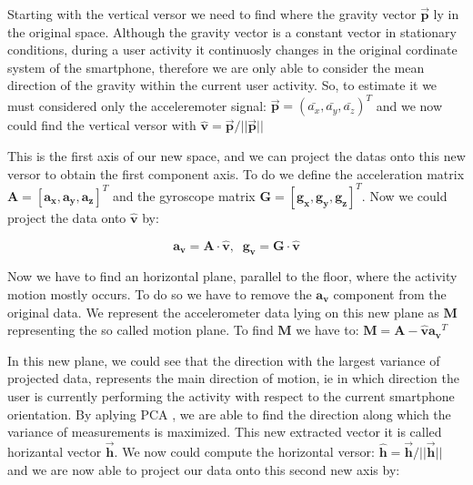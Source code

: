 Starting with the vertical versor we need to find where the gravity vector $\boldsymbol{\vec{p}}$ ly in the original space. Although the gravity vector is a constant vector in stationary conditions, during a user activity it continuosly changes in the original cordinate system of the smartphone, therefore we are only able to consider the mean direction of the gravity within the current user activity. So, to estimate it we must considered only the acceleremoter signal: $ \boldsymbol{\vec{p}} = (\bar{a_{x}}, \bar{a_{y}}, \bar{a_{z}})^{T}$  and we now could find the vertical versor with $ \boldsymbol{\hat{v}} = \boldsymbol{\vec{p}} / ||\boldsymbol{\vec{p}}|| $

This is the first axis of our new space, and we can project the datas onto this new versor to obtain the first component axis. To do we define the acceleration matrix $\boldsymbol{A} = [ \boldsymbol{a_{x}}, \boldsymbol{a_{y}}, \boldsymbol{a_{z}} ]^{T}$ and the gyroscope matrix $\boldsymbol{G} = [ \boldsymbol{g_{x}}, \boldsymbol{g_{y}}, \boldsymbol{g_{z}} ]^{T} $. Now we could project the data onto $\boldsymbol{\hat{v}}$ by:

\begin{equation}
	\label{v-axis eq}
	 \boldsymbol{a_{v}} = \boldsymbol{A} \cdot \boldsymbol{\hat{v}} ,\;\; \boldsymbol{g_{v}} = \boldsymbol{G} \cdot \boldsymbol{\hat{v}} 
\end{equation}

Now we have to find an horizontal plane, parallel to the floor, where the activity motion mostly occurs. To do so we have to remove the  $\boldsymbol{a_{v}}$ component from the original data. We represent the accelerometer data lying on this new plane as $\boldsymbol{M}$ representing the so called motion plane. To find $\boldsymbol{M}$ we have to: $\boldsymbol{M} = \boldsymbol{A} - \boldsymbol{\hat{v}} \boldsymbol{a_{v}}^{T} $

In this new plane, we could see that the direction with the largest variance of projected data, represents the main direction of motion, ie in which direction the user is currently performing the activity with respect to the current smartphone orientation. By aplying PCA \cite{rao1964use}, we are able to find the direction along which the variance of measurements is maximized. This new extracted vector it is called horizantal vector $\boldsymbol{\vec{h}}$. We now could compute the horizontal versor:	$ \boldsymbol{\hat{h}} = \boldsymbol{\vec{h}} / ||\boldsymbol{\vec{h}}|| $ and we are now able to project our data onto this second new axis by:

